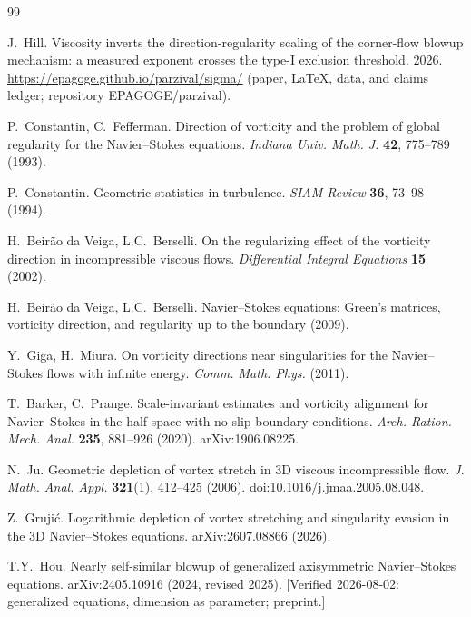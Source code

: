 \documentclass[11pt]{article}
\begin{document}
\begin{thebibliography}{99}

 J.~Hill.
Viscosity inverts the direction-regularity scaling of the corner-flow
blowup mechanism: a measured exponent crosses the type-I exclusion
threshold. 2026.
\url{https://epagoge.github.io/parzival/sigma/}
(paper, LaTeX, data, and claims ledger; repository EPAGOGE/parzival).

 P.~Constantin, C.~Fefferman.
Direction of vorticity and the problem of global regularity for the
Navier--Stokes equations.
\emph{Indiana Univ. Math. J.} \textbf{42}, 775--789 (1993).

 P.~Constantin.
Geometric statistics in turbulence.
\emph{SIAM Review} \textbf{36}, 73--98 (1994).

 H.~Beir\~ao da Veiga, L.C.~Berselli.
On the regularizing effect of the vorticity direction in
incompressible viscous flows.
\emph{Differential Integral Equations} \textbf{15} (2002).

 H.~Beir\~ao da Veiga, L.C.~Berselli.
Navier--Stokes equations: Green's matrices, vorticity direction, and
regularity up to the boundary (2009).

 Y.~Giga, H.~Miura.
On vorticity directions near singularities for the Navier--Stokes
flows with infinite energy.
\emph{Comm. Math. Phys.} (2011).

 T.~Barker, C.~Prange.
Scale-invariant estimates and vorticity alignment for Navier--Stokes
in the half-space with no-slip boundary conditions.
\emph{Arch. Ration. Mech. Anal.} \textbf{235}, 881--926 (2020).
arXiv:1906.08225.

 N.~Ju.
Geometric depletion of vortex stretch in 3D viscous incompressible
flow.
\emph{J. Math. Anal. Appl.} \textbf{321}(1), 412--425 (2006).
doi:10.1016/j.jmaa.2005.08.048.

 Z.~Gruji\'c.
Logarithmic depletion of vortex stretching and singularity evasion in
the 3D Navier--Stokes equations.
arXiv:2607.08866 (2026).

 T.Y.~Hou.
Nearly self-similar blowup of generalized axisymmetric Navier--Stokes
equations.
arXiv:2405.10916 (2024, revised 2025).
[Verified 2026-08-02: generalized equations, dimension as parameter;
preprint.]

\end{thebibliography}
\end{document}
